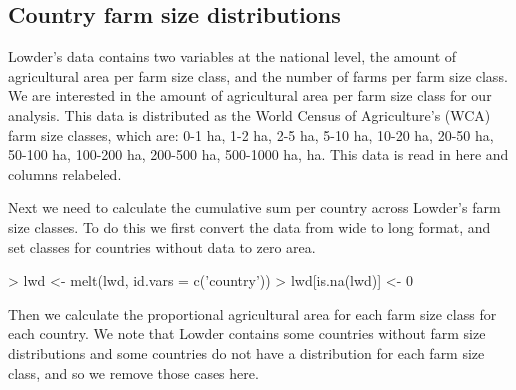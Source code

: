 \documentclass{article}
\begin{document}
\subsection{Country farm size distributions}

Lowder's data contains two variables at the national level, the amount of agricultural area per farm size class, and the number of farms per farm size class. We are interested in the amount of agricultural area per farm size class for our analysis. This data is distributed as the World Census of Agriculture's (WCA) farm size classes, which are: 0-1 ha, 1-2 ha, 2-5 ha, 5-10 ha, 10-20 ha, 20-50 ha, 50-100 ha, 100-200 ha, 200-500 ha, 500-1000 ha,  ha. This data is read in here and columns relabeled.

\begin{Schunk}
\end{Schunk}

Next we need to calculate the cumulative sum per country across Lowder's farm size classes.  To do this we first convert the data from wide to long format, and set classes for countries without data to zero area.

\begin{Schunk}
\begin{Sinput}
> lwd <- melt(lwd, id.vars = c('country'))
> lwd[is.na(lwd)] <- 0
\end{Sinput}
\end{Schunk}

Then we calculate the proportional agricultural area for each farm size class for each country. We note that Lowder contains some countries without farm size distributions and some countries do not have a distribution for each farm size class, and so we remove those cases here.
\end{document}
